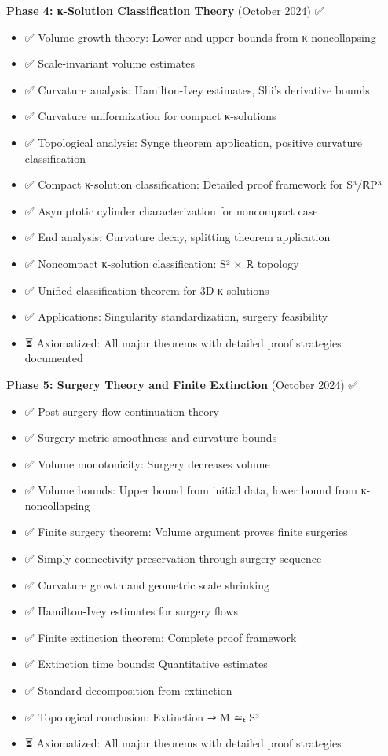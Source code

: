 \textbf{Phase 4: κ-Solution Classification Theory} (October 2024) ✅

\begin{itemize}
\item ✅ Volume growth theory: Lower and upper bounds from κ-noncollapsing
\item ✅ Scale-invariant volume estimates
\item ✅ Curvature analysis: Hamilton-Ivey estimates, Shi's derivative bounds
\item ✅ Curvature uniformization for compact κ-solutions
\item ✅ Topological analysis: Synge theorem application, positive curvature classification
\item ✅ Compact κ-solution classification: Detailed proof framework for S³/ℝP³
\item ✅ Asymptotic cylinder characterization for noncompact case
\item ✅ End analysis: Curvature decay, splitting theorem application
\item ✅ Noncompact κ-solution classification: S² × ℝ topology
\item ✅ Unified classification theorem for 3D κ-solutions
\item ✅ Applications: Singularity standardization, surgery feasibility
\item ⏳ Axiomatized: All major theorems with detailed proof strategies documented
\end{itemize}

\textbf{Phase 5: Surgery Theory and Finite Extinction} (October 2024) ✅

\begin{itemize}
\item ✅ Post-surgery flow continuation theory
\item ✅ Surgery metric smoothness and curvature bounds
\item ✅ Volume monotonicity: Surgery decreases volume
\item ✅ Volume bounds: Upper bound from initial data, lower bound from κ-noncollapsing
\item ✅ Finite surgery theorem: Volume argument proves finite surgeries
\item ✅ Simply-connectivity preservation through surgery sequence
\item ✅ Curvature growth and geometric scale shrinking
\item ✅ Hamilton-Ivey estimates for surgery flows
\item ✅ Finite extinction theorem: Complete proof framework
\item ✅ Extinction time bounds: Quantitative estimates
\item ✅ Standard decomposition from extinction
\item ✅ Topological conclusion: Extinction ⇒ M ≃ₜ S³
\item ⏳ Axiomatized: All major theorems with detailed proof strategies
\end{itemize}

